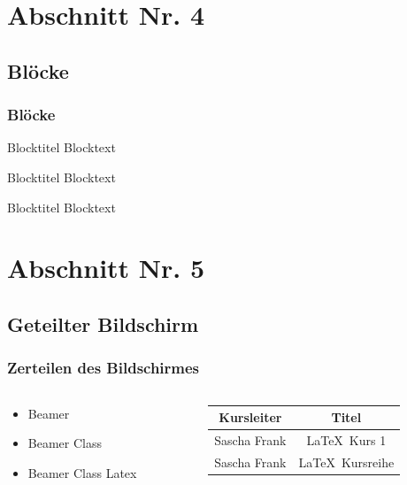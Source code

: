 \section{Abschnitt Nr. 4}
\subsection{Bl\"ocke}
\begin{frame}\frametitle{Bl\"ocke}

\begin{block}{Blocktitel}
Blocktext 
\end{block}

\begin{exampleblock}{Blocktitel}
Blocktext 
\end{exampleblock}


\begin{alertblock}{Blocktitel}
Blocktext 
\end{alertblock}
\end{frame}

\section{Abschnitt Nr. 5}
\subsection{Geteilter Bildschirm}

\begin{frame}\frametitle{Zerteilen des Bildschirmes}
\begin{columns}
\begin{column}{5cm}
\begin{itemize}
\item Beamer 
\item Beamer Class 
\item Beamer Class Latex 
\end{itemize}
\end{column}
\begin{column}{5cm}
\begin{tabular}{|c|c|}
\hline
\textbf{Kursleiter} & \textbf{Titel} \\
\hline
Sascha Frank &  \LaTeX \ Kurs 1 \\
\hline
Sascha Frank & \LaTeX \ Kursreihe \\
\hline
\end{tabular}
\end{column}
\end{columns}
\end{frame}



